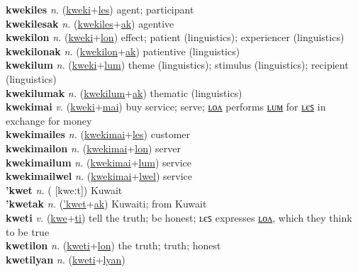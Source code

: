 \textbf{kwekiles} \textit{n.} (\hyperref[kweki]{kweki}+\hyperref[les]{les})
agent; participant \label{kwekiles} \\
\textbf{kwekilesak} \textit{n.} (\hyperref[kwekiles]{kwekiles}+\hyperref[ak]{ak})
agentive \label{kwekilesak} \\
\textbf{kwekilon} \textit{n.} (\hyperref[kweki]{kweki}+\hyperref[lon]{lon})
effect; patient (linguistics); experiencer (linguistics) \label{kwekilon} \\
\textbf{kwekilonak} \textit{n.} (\hyperref[kwekilon]{kwekilon}+\hyperref[ak]{ak})
patientive (linguistics) \label{kwekilonak} \\
\textbf{kwekilum} \textit{n.} (\hyperref[kweki]{kweki}+\hyperref[lum]{lum})
theme (linguistics); stimulus (linguistics); recipient (linguistics) \label{kwekilum} \\
\textbf{kwekilumak} \textit{n.} (\hyperref[kwekilum]{kwekilum}+\hyperref[ak]{ak})
thematic (linguistics) \label{kwekilumak} \\
\textbf{kwekimai} \textit{v.} (\hyperref[kweki]{kweki}+\hyperref[mai]{mai})
buy service; serve; \hyperref[kwekimailon]{ʟᴏᴧ} performs \hyperref[kwekimailum]{ʟᴜᴍ} for \hyperref[kwekimailes]{ʟєꜱ} in exchange for money \label{kwekimai} \\
\textbf{kwekimailes} \textit{n.} (\hyperref[kwekimai]{kwekimai}+\hyperref[les]{les})
customer \label{kwekimailes} \\
\textbf{kwekimailon} \textit{n.} (\hyperref[kwekimai]{kwekimai}+\hyperref[lon]{lon})
server \label{kwekimailon} \\
\textbf{kwekimailum} \textit{n.} (\hyperref[kwekimai]{kwekimai}+\hyperref[lum]{lum})
service \label{kwekimailum} \\
\textbf{kwekimailwel} \textit{n.} (\hyperref[kwekimai]{kwekimai}+\hyperref[lwel]{lwel})
service \label{kwekimailwel} \\
\textbf{'kwet} \textit{n.} ( [kweːt])
Kuwait \label{'kwet} \\
\textbf{'kwetak} \textit{n.} (\hyperref['kwet]{'kwet}+\hyperref[ak]{ak})
Kuwaiti; from Kuwait \label{'kwetak} \\
\textbf{kweti} \textit{v.} (\hyperref[kwe]{kwe}+\hyperref[ti]{ti})
tell the truth; be honest; ʟєꜱ expresses \hyperref[kwetilon]{ʟᴏᴧ}, which they think to be true \label{kweti} \\
\textbf{kwetilon} \textit{n.} (\hyperref[kweti]{kweti}+\hyperref[lon]{lon})
the truth; truth; honest \label{kwetilon} \\
\textbf{kwetilyan} \textit{n.} (\hyperref[kweti]{kweti}+\hyperref[lyan]{lyan})
